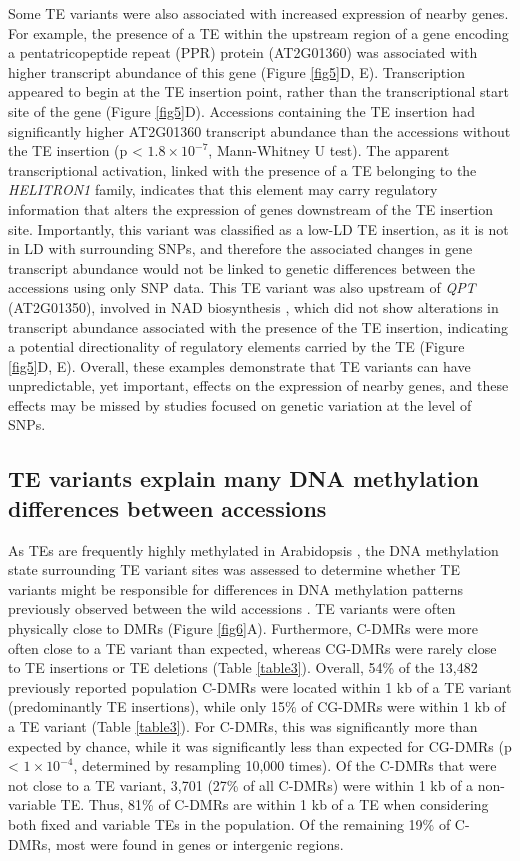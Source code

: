 \documentclass[12pt]{article}
\begin{document}
Some TE variants were also associated with increased expression of
nearby genes. For example, the presence of a TE within the upstream
region of a gene encoding a pentatricopeptide repeat (PPR) protein
(AT2G01360) was associated with higher transcript abundance of this gene
(Figure \ref{fig5}D, E). Transcription appeared to begin at the TE insertion
point, rather than the transcriptional start site of the gene (Figure
\ref{fig5}D). Accessions containing the TE insertion had significantly higher
AT2G01360 transcript abundance than the accessions without the TE
insertion (p \textless{} $1.8 \times10^{-7}$, Mann-Whitney U test). The apparent
transcriptional activation, linked with the presence of a TE belonging
to the \emph{HELITRON1} family, indicates that this element may carry
regulatory information that alters the expression of genes downstream of
the TE insertion site. Importantly, this variant was classified as a
low-LD TE insertion, as it is not in LD with surrounding SNPs, and
therefore the associated changes in gene transcript abundance would not
be linked to genetic differences between the accessions using only SNP
data. This TE variant was also upstream of \emph{QPT }(AT2G01350),
involved in NAD biosynthesis \cite{Katoh:2006if}, which did not show
alterations in transcript abundance associated with the presence of the
TE insertion, indicating a potential directionality of regulatory
elements carried by the TE (Figure \ref{fig5}D, E). Overall, these examples
demonstrate that TE variants can have unpredictable, yet important,
effects on the expression of nearby genes, and these effects may be
missed by studies focused on genetic variation at the level of SNPs.

\subsection{TE variants explain many DNA methylation differences between
accessions}

As TEs are frequently highly methylated in Arabidopsis
\cite{Zhang:2006eo, Zilberman:2006hx, Cokus:2008fc, Lister:2008bh},
the DNA methylation state surrounding TE variant sites was assessed to
determine whether TE variants might be responsible for differences in
DNA methylation patterns previously observed between the wild
accessions \cite{Schmitz:2013iu}. TE variants were often physically
close to DMRs (Figure \ref{fig6}A). Furthermore, C-DMRs were more
often close to a TE variant than expected, whereas CG-DMRs were rarely
close to TE insertions or TE deletions (Table \ref{table3}). Overall,
54\% of the 13,482 previously reported population C-DMRs were located
within 1 kb of a TE variant (predominantly TE insertions), while only
15\% of CG-DMRs were within 1 kb of a TE variant (Table
\ref{table3}). For C-DMRs, this was significantly more than expected
by chance, while it was significantly less than expected for CG-DMRs
(p \textless{} $1 \times10^{-4}$, determined by resampling 10,000 times). Of
the C-DMRs that were not close to a TE variant, 3,701 (27\% of all
C-DMRs) were within 1 kb of a non-variable TE. Thus, 81\% of C-DMRs
are within 1 kb of a TE when considering both fixed and variable TEs
in the population. Of the remaining 19\% of C-DMRs, most were found in
genes or intergenic regions.
\end{document}
